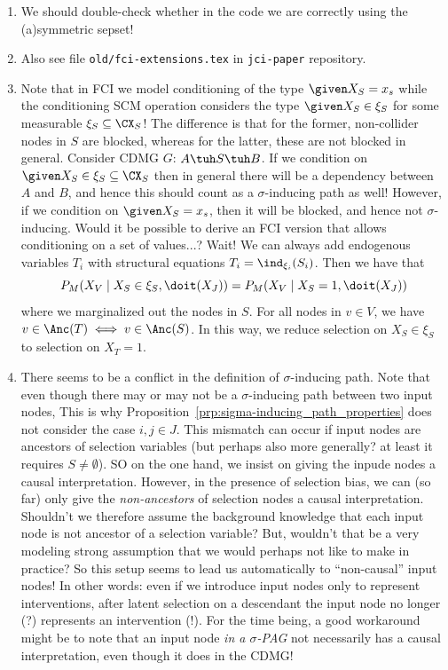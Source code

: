 {\begin{enumerate}
  \item We should double-check whether in the code we are correctly using the (a)symmetric sepset!

  \item Also see file \texttt{old/fci-extensions.tex} in \texttt{jci-paper} repository.

  \item Note that in FCI we model conditioning of the type $\given X_S = x_s$ while the conditioning SCM operation considers the type $\given X_S \in \xi_S$ for some measurable $\xi_S \subseteq \CX_S$! 
    The difference is that for the former, non-collider nodes in $S$ are blocked, whereas for the latter, these are not blocked in general.
    Consider CDMG $G$: $A \tuh S \tuh B$. If we condition on $\given X_S \in \xi_S \subseteq \CX_S$ then in general there will be a dependency between $A$ and $B$, and hence this should count as a $\sigma$-inducing path as well! However, if we condition on $\given X_S=x_s$, then it will be blocked, and hence not $\sigma$-inducing.
    Would it be possible to derive an FCI version that allows conditioning on a set of values...?
    Wait! We can always add endogenous variables $T_i$ with structural equations $T_i = \ind_{\xi_i}(S_i)$. 
    Then we have that 
      $$P_M(X_V \mid X_S \in \xi_S, \doit(X_J)) = P_M(X_V \mid X_S = 1, \doit(X_J))$$
    where we marginalized out the nodes in $S$.
    For all nodes in $v \in V$, we have $v \in \Anc(T) \iff v \in \Anc(S)$.
    In this way, we reduce selection on $X_S \in \xi_S$ to selection on $X_T = 1$.

  \item There seems to be a conflict in the definition of $\sigma$-inducing path. Note that even 
    though there may or may not be a $\sigma$-inducing path between two input nodes, 
    This is why Proposition~\ref{prp:sigma-inducing_path_properties} does not consider the case $i,j \in J$.
    This mismatch can occur if input nodes are ancestors of selection variables (but perhaps also more generally? at least it requires $S \ne \emptyset$).
    SO on the one hand, we insist on giving the inpude nodes a causal interpretation. 
    However, in the presence of selection bias, we can (so far) only give the \emph{non-ancestors} of selection nodes a causal interpretation. 
    Shouldn't we therefore assume the background knowledge that each input node is not ancestor of a selection variable? 
    But, wouldn't that be a very modeling strong assumption that we would perhaps not like to make in practice?
    So this setup seems to lead us automatically to ``non-causal'' input nodes! In other words:
    even if we introduce input nodes only to represent interventions, after latent selection on a descendant the input node no longer (?) represents an intervention (!).
    For the time being, a good workaround might be to note that an input node \emph{in a $\sigma$-PAG} not necessarily has a causal interpretation, even though it does in the CDMG!
\end{enumerate}
}
